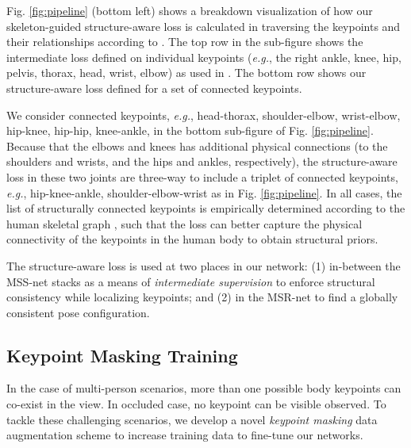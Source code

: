 \documentclass[runningheads]{llncs}
\begin{document}
Fig. \ref{fig:pipeline} (bottom left) shows a breakdown visualization of how our skeleton-guided structure-aware loss is calculated in traversing the keypoints and their relationships according to . The top row in the sub-figure shows the intermediate loss defined on individual keypoints ({\em e.g.}, the right ankle, knee, hip, pelvis, thorax, head, wrist, elbow) as used in \cite{wei2016convolutional,newell2016stacked}.
The bottom row shows our structure-aware loss defined for a set of connected keypoints.

We consider connected keypoints, {\em e.g.}, head-thorax, shoulder-elbow, wrist-elbow, hip-knee, hip-hip, knee-ankle, in the bottom sub-figure of Fig. \ref{fig:pipeline}.
Because that the elbows and knees has additional physical connections (to the shoulders and wrists, and the hips and ankles, respectively), the structure-aware loss in these two joints are three-way to include a triplet of connected keypoints, {\em e.g.}, hip-knee-ankle, shoulder-elbow-wrist as in Fig. \ref{fig:pipeline}. In all cases, the list of structurally connected keypoints is empirically determined according to the human skeletal graph , such that the loss can better capture the physical connectivity of the keypoints in the human body to obtain structural priors.

The structure-aware loss is used at two places in our network:
(1) in-between the MSS-net stacks as a means of {\em intermediate supervision} to enforce structural consistency while localizing keypoints; and 
(2) in the MSR-net to find a globally consistent pose configuration.













\subsection{Keypoint Masking Training}
\label{sec:keypoint:mask}

In the case of multi-person scenarios, more than one possible body keypoints can co-exist in the view. In occluded case, no keypoint can be visible observed. To tackle these challenging scenarios, we develop a novel {\em keypoint masking} data augmentation scheme to increase training data to fine-tune our networks.  
\end{document}
